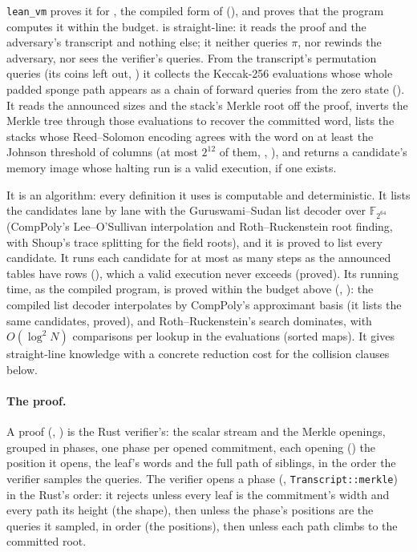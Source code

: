 \documentclass[11pt]{article}
\begin{document}
\texttt{lean\_vm} proves it for , the compiled form of
 (), and proves
that the program computes it within the budget.  is straight-line: it reads the proof and
the adversary's transcript and nothing else; it neither queries $\pi$, nor rewinds the adversary,
nor sees the verifier's queries. From the transcript's permutation queries (its coins left out,
) it collects the Keccak-256 evaluations whose
whole padded sponge path appears as a chain of forward queries from the zero state
(). It reads the announced sizes and the stack's Merkle root off the proof,
inverts the Merkle tree through those evaluations to recover the committed word, lists the stacks
whose Reed--Solomon encoding agrees with the word on at least the Johnson threshold of columns (at
most $2^{12}$ of them, , ), and returns a candidate's memory
image whose halting run is a valid execution, if one exists.

It is an algorithm: every definition it uses is computable and deterministic. It lists the
candidates lane by lane with the Guruswami--Sudan list decoder over $\mathbb{F}_{2^{64}}$
(CompPoly's Lee--O'Sullivan interpolation and Roth--Ruckenstein root finding, with Shoup's trace
splitting for the field roots), and it is proved to list every candidate. It runs each
candidate for at most as many steps as the announced tables have rows (), which a
valid execution never exceeds (proved). Its running time, as the compiled program, is proved
within the budget above (, ): the compiled list decoder
interpolates by CompPoly's approximant basis (it lists the same candidates, proved), and
Roth--Ruckenstein's search dominates, with $O(\log^2 N)$ comparisons per lookup in the evaluations (sorted maps). It gives straight-line knowledge with a
concrete reduction cost for the collision clauses below.

\paragraph{The proof.} A proof (, ) is the Rust
verifier's: the scalar stream and the Merkle openings, grouped in phases, one phase per opened
commitment, each opening () the position it opens, the leaf's words and the full path
of siblings, in the order the verifier samples the queries. The verifier opens a phase
(, \texttt{Transcript::merkle}) in the Rust's order: it rejects unless every leaf is
the commitment's width and every path its height (the shape), then unless the phase's positions are
the queries it sampled, in order (the positions), then unless each path climbs to the committed
root.
\end{document}
